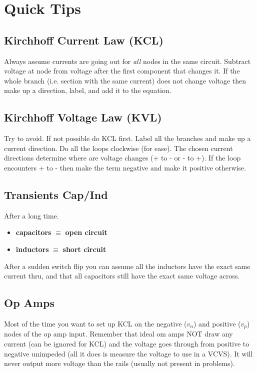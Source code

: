 \section{Quick Tips}
\subsection*{Kirchhoff Current Law (KCL)}
Always assume currents are going out for \textit{all} nodes in the same
circuit. Subtract voltage at node from voltage after the first component
that changes it. If the whole branch (i.e. section with the same
current) does not change voltage then make up a direction, label, and
add it to the equation.

\subsection*{Kirchhoff Voltage Law (KVL)}
Try to avoid. If not possible do KCL first. Label all the branches and
make up a current direction. Do all the loops clockwise (for ease). The
chosen current directions determine where are voltage changes (+ to - or
- to +). If the loop encounters + to - then make the term negative and
make it positive otherwise.

\subsection*{Transients Cap/Ind}
After a long time.
\begin{itemize}
  \item \textbf{capacitors} $\equiv$ \textbf{open circuit}
  \item \textbf{inductors} $\equiv$ \textbf{short circuit}
\end{itemize}
After a sudden switch flip you can assume all the inductors have the
exact same current thru, and that all capacitors still have the exact
same voltage across.

\subsection*{Op Amps}
Most of the time you want to set up KCL on the negative ($v_n$) and
positive ($v_p$) nodes of the op amp input. Remember that ideal om amps
NOT draw any current (can be ignored for KCL) and the voltage goes
through from positive to negative unimpeded (all it does is measure the
voltage to use in a VCVS). It will never output more voltage than the
rails (usually not present in problems).

